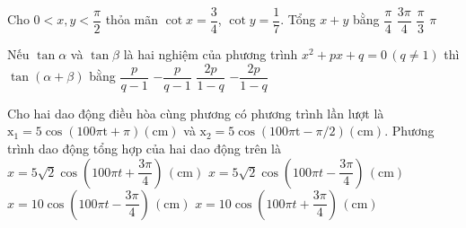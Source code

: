 \begin{ex}%
	Cho $0<x, y<\dfrac{\pi}{2}$ thỏa mãn $\cot x=\dfrac{3}{4}$, $\cot y=\dfrac{1}{7}.$ Tổng $x+y$ bằng
	\choice
	{$\dfrac{\pi}{4}$}
	{\True $\dfrac{{3\pi}}{4}$}
	{$\dfrac{\pi}{3}$}
	{$\pi$}
\end{ex}
\begin{ex}%
	Nếu $\tan \alpha $ và $\tan \beta $ là hai nghiệm của phương trình $x^2+px+q=0 \,\left({q\ne 1}\right)$ thì $\tan \left({\alpha+\beta}\right)$ bằng
	\choice
	{\True $\dfrac{p}{{q-1}}$}
	{$-\dfrac{p}{{q-1}}$}
	{$\dfrac{{2p}}{{1-q}}$}
	{$-\dfrac{{2p}}{{1-q}}$}
\end{ex}

\begin{ex}
	Cho hai dao động điều hòa cùng phương có phương trình lần lượt là $\mathrm{x}_1=5 \cos (100 \pi \mathrm{t}+\pi)(\mathrm{cm})$ và $\mathrm{x}_2=5 \cos (100 \pi \mathrm{t}-\pi / 2)(\mathrm{cm})$. Phương trình dao động tổng hợp của hai dao động trên là
	\choice
	{$x=5 \sqrt{2} \cos \left( 100 \pi t+\dfrac{3\pi}{4}\right)\, (\mathrm{cm})$}
	{\True $x=5 \sqrt{2} \cos \left(100 \pi t-\dfrac{3\pi}{4}\right)\,(\mathrm{cm})$}
	{$x=10 \cos \left(100 \pi t-\dfrac{3\pi}{4}\right)\,(\mathrm{cm})$}
	{$x=10 \cos \left(100 \pi t+\dfrac{3\pi}{4}\right)\,(\mathrm{cm})$}
\end{ex}

